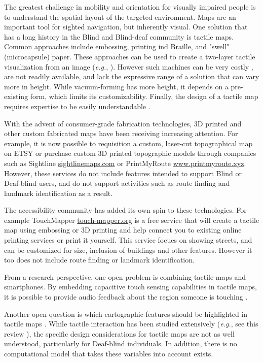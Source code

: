 The greatest challenge in mobility and orientation for visually impaired people is to understand the spatial layout of the targeted environment. Maps are an important tool for sighted navigation, but inherently visual. One solution that has a long history in the Blind and Blind-deaf community is tactile maps. Common approaches include embossing, printing ind Braille, and "swell" (microcapsule) paper. These approaches can be used to create a two-layer tactile visualization from an image (\textit{e.g.}, \cite{miele2006talking}). However such machines can be very costly \cite{rice2005design}, are not readily available, and lack the expressive range of a solution that can vary more in height. While vacuum-forming has more height, it depends on a pre-existing form, which limits its customizability. Finally, the design of a tactile map requires expertise to be easily understandable \cite{tatham1991design}.

With the advent of consumer-grade fabrication technologies, 3D printed and other custom fabricated maps have been receiving increasing attention. For example, it is now possible to requisition a custom, laser-cut topographical map on ETSY \cite{etsy} or purchase custom 3D printed topographic models through companies such as Sightline \url{sightlinemaps.com} or PrintMyRoute \url{www.printmyroute.xyz}. However, these services do not include features intended to support Blind or Deaf-blind users, and do not support activities such as route finding and landmark identification as a result. 

The accessibility community has added its own spin to these technologies. For example TouchMapper \url{touch-mapper.org} is a free service that will create a tactile map using embossing or 3D printing and help connect you to existing online printing services or print it yourself.  This service focues on showing streets, and can be customized for size, inclusion of buildings and other features. However it too does not include route finding or landmark identification. 

From a research perspective, one open problem is combining tactile maps and smartphones. By embedding capacitive touch sensing capabilities in tactile maps, it is possible to provide audio feedback about the region someone is touching \cite{taylor2016customizable, rusu2010semantic,gotzelmann2016lucentmaps}. 

Another open question is which cartographic features should be highlighted in tactile maps \cite{haberling2008proposed}. While tactile interaction has been studied extensively (\textit{e.g.}, see this review \cite{o2015designing}), the specific design considerations for tactile maps are not as well understood, particularly for Deaf-blind individuals. In addition, there is no computational model that takes these variables into account exists.

